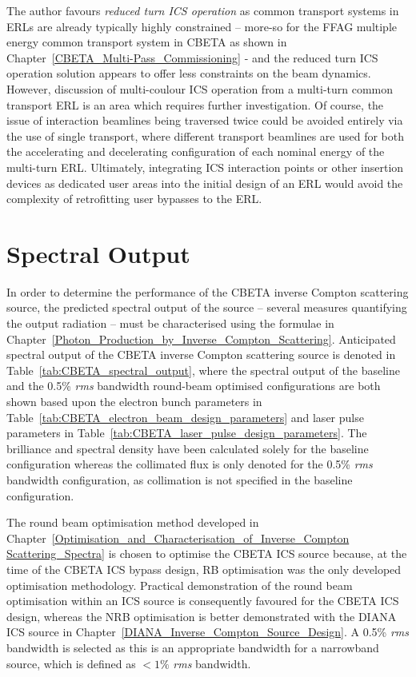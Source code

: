 \documentclass[../main.tex]{subfiles}
\begin{document}
The author favours \textit{reduced turn ICS operation} as common transport systems in ERLs are already typically highly constrained -- more-so for the FFAG multiple energy common transport system in CBETA as shown in Chapter~\ref{CBETA_Multi-Pass_Commissioning} - and the reduced turn ICS operation solution appears to offer less constraints on the beam dynamics. However, discussion of multi-coulour ICS operation from a multi-turn common transport ERL is an area which requires further investigation. Of course, the issue of interaction beamlines being traversed twice could be avoided entirely via the use of single transport, where different transport beamlines are used for both the accelerating and decelerating configuration of each nominal energy of the multi-turn ERL. Ultimately, integrating ICS interaction points or other insertion devices as dedicated user areas into the initial design of an ERL would avoid the complexity of retrofitting user bypasses to the ERL.     

\section{Spectral Output}

In order to determine the performance of the CBETA inverse Compton scattering source, the predicted spectral output of the source -- several measures quantifying the output radiation -- must be characterised using the formulae in Chapter~\ref{Photon_Production_by_Inverse_Compton_Scattering}. Anticipated spectral output of the CBETA inverse Compton scattering source is denoted in Table~\ref{tab:CBETA_spectral_output}, where the spectral output of the baseline and the 0.5\% \textit{rms} bandwidth round-beam optimised configurations are both shown based upon the electron bunch parameters in Table~\ref{tab:CBETA_electron_beam_design_parameters} and laser pulse parameters in Table~\ref{tab:CBETA_laser_pulse_design_parameters}. The brilliance and spectral density have been calculated solely for the baseline configuration whereas the collimated flux is only denoted for the 0.5\% \textit{rms} bandwidth configuration, as collimation is not specified in the baseline configuration.

The round beam optimisation method developed in Chapter~\ref{Optimisation_and_Characterisation_of_Inverse_Compton Scattering_Spectra} is chosen to optimise the CBETA ICS source because, at the time of the CBETA ICS bypass design, RB optimisation was the only developed optimisation methodology. Practical demonstration of the round beam optimisation within an ICS source is consequently favoured for the CBETA ICS design, whereas the NRB optimisation is better demonstrated with the DIANA ICS source in Chapter~\ref{DIANA_Inverse_Compton_Source_Design}. A 0.5\% \textit{rms} bandwidth is selected as this is an appropriate bandwidth for a narrowband source, which is defined as $< 1\%$ \textit{rms} bandwidth. 
\end{document}
